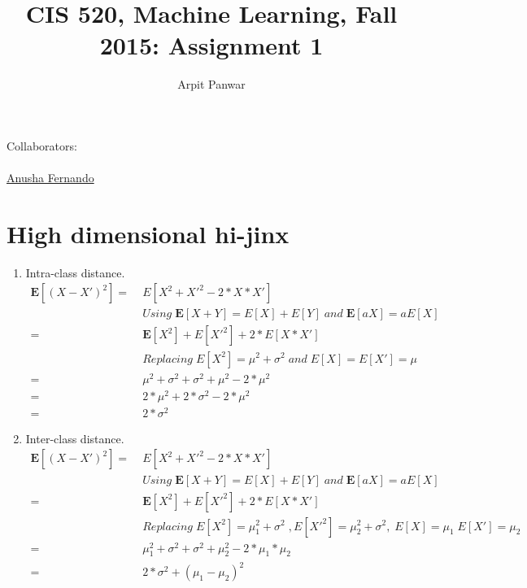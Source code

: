 \documentclass[english]{article}
\title{CIS 520, Machine Learning, Fall 2015: Assignment 1}
\author{Arpit Panwar}
\newcommand{\E}{\mathbf{E}}
\begin{document}
\maketitle
{\normalsize Collaborators: \\ 
\\ \underline{ Anusha Fernando   }} \\

\section{High dimensional hi-jinx}

\begin{enumerate}
\item Intra-class distance.
  \begin{align*}
    \E[(X - X')^2] =&\; E[X^2 + X'^2 - 2*X*X'] \\
    &\; Using \; \E[X + Y] = E[X] + E[Y] \; and \; \E[aX] = aE[X] \\
    =&\; \E[X^2] + E[X'^2] + 2* E[X * X'] \\
    &\; Replacing \; E[X^2] = \mu^2 + \sigma^2  \; and \; E[X] = E[X'] = \mu \\
    =&\; \mu^2 + \sigma^2 + \sigma^2 + \mu^2 - 2 * \mu^2 \\
    =&\; 2*\mu^2 + 2*\sigma^2 - 2*\mu^2  \\
    =&\; 2*\sigma^2
  \end{align*}

\item Inter-class distance.
  \begin{align*}
    \E[(X - X')^2] =&\; E[X^2 + X'^2 - 2*X*X'] \\
    &\; Using \; \E[X + Y] = E[X] + E[Y] \; and \; \E[aX] = aE[X] \\
    =&\; \E[X^2] + E[X'^2] + 2* E[X * X'] \\
    &\; Replacing \; E[X^2] = \mu_1^2 + \sigma^2  \; , E[X'^2] = \mu_2^2 + \sigma^2,\; E[X] = \mu_1 \; E[X'] = \mu_2 \;  \\
    =&\; \mu_1^2 + \sigma^2 + \sigma^2 + \mu_2^2 - 2 * \mu_1 * \mu_2 \\
    =&\; 2*\sigma^2 + (\mu_1 - \mu_2)^2 \\
  \end{align*}


\end{enumerate}
\end{document}
